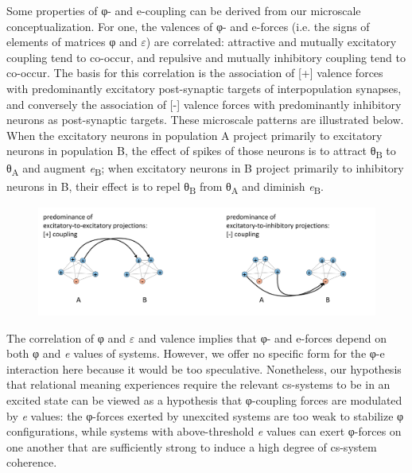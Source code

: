 

  Some properties of φ- and e-coupling can be derived from our microscale conceptualization. For one, the valences of φ- and e-forces (i.e. the signs of elements of matrices φ and $\varepsilon $) are correlated: attractive and mutually excitatory coupling tend to co-occur, and repulsive and mutually inhibitory coupling tend to co-occur. The basis for this correlation is the association of [+] valence forces with predominantly excitatory post-synaptic targets of interpopulation synapses, and conversely the association of [-] valence forces with predominantly inhibitory neurons as post-synaptic targets. These microscale patterns are illustrated below. When the excitatory neurons in population A project primarily to excitatory neurons in population B, the effect of spikes of those neurons is to attract θ\textsubscript{B} to θ\textsubscript{A} and augment \textit{e}\textsubscript{B}; when excitatory neurons in B project primarily to inhibitory neurons in B, their effect is to repel θ\textsubscript{B} from θ\textsubscript{A} and diminish \textit{e}\textsubscript{B}. 

  
\begin{figure}
\includegraphics[width=\textwidth]{figures/Tilsen-img21.png}
\caption{\missingcaption}
\label{fig:2:14}
\end{figure}
 

  The correlation of φ and $\varepsilon $ and valence implies that φ- and e-forces depend on both φ and \textit{e} values of systems. However, we offer no specific form for the φ-e interaction here because it would be too speculative. Nonetheless, our hypothesis that relational meaning experiences require the relevant cs-systems to be in an excited state can be viewed as a hypothesis that φ-coupling forces are modulated by \textit{e} values: the φ-forces exerted by unexcited systems are too weak to stabilize φ configurations, while systems with above-threshold \textit{e} values can exert φ-forces on one another that are sufficiently strong to induce a high degree of cs-system coherence.

